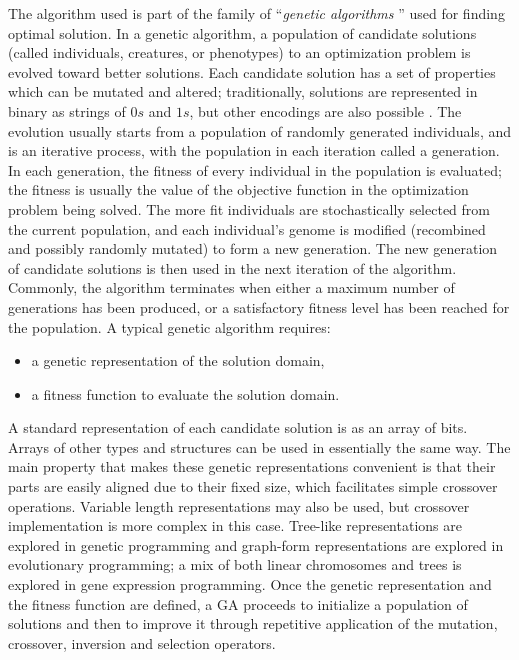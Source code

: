 \noindent The algorithm used is part of the family of ``\emph{genetic algorithms} \cite{wiki:xxx}'' used for finding optimal solution.
In a genetic algorithm, a population of candidate solutions (called individuals, creatures, or phenotypes) to an optimization problem is evolved toward better solutions. Each candidate solution has a set of properties which can be mutated and altered; traditionally, solutions are represented in binary as strings of $0s$ and $1s$, but other encodings are also possible \cite{Whitley1994}.
The evolution usually starts from a population of randomly generated individuals, and is an iterative process, with the population in each iteration called a generation. In each generation, the fitness of every individual in the population is evaluated; the fitness is usually the value of the objective function in the optimization problem being solved. The more fit individuals are stochastically selected from the current population, and each individual's genome is modified (recombined and possibly randomly mutated) to form a new generation. The new generation of candidate solutions is then used in the next iteration of the algorithm. Commonly, the algorithm terminates when either a maximum number of generations has been produced, or a satisfactory fitness level has been reached for the population.\linebreak
A typical genetic algorithm requires:
\begin{itemize}
\item a genetic representation of the solution domain,
\item a fitness function to evaluate the solution domain.
\end{itemize}
A standard representation of each candidate solution is as an array of bits\cite{Whitley1994}. Arrays of other types and structures can be used in essentially the same way. The main property that makes these genetic representations convenient is that their parts are easily aligned due to their fixed size, which facilitates simple crossover operations. Variable length representations may also be used, but crossover implementation is more complex in this case. Tree-like representations are explored in genetic programming and graph-form representations are explored in evolutionary programming; a mix of both linear chromosomes and trees is explored in gene expression programming.
Once the genetic representation and the fitness function are defined, a GA proceeds to initialize a population of solutions and then to improve it through repetitive application of the mutation, crossover, inversion and selection operators.
